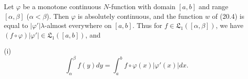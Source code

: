 Let $\varphi$ be a monotone continuous $N$-function with domain $[a, b]$ and range $[\alpha, \beta]$ ($\alpha < \beta$). Then $\varphi$ is absolutely continuous, and the function $w$ of (20.4) is equal to $|\varphi'| \lambda$-almost everywhere on $[a, b]$. Thus for $f \in \mathfrak{L}_1([\alpha, \beta])$, we have $(f \circ \varphi) |\varphi'| \in \mathfrak{L}_1([a, b])$, and

(i) $$\int_{\alpha}^{\beta} f(y) dy = \int_{a}^{b} f \circ \varphi(x) |\varphi'(x)| dx.$$
